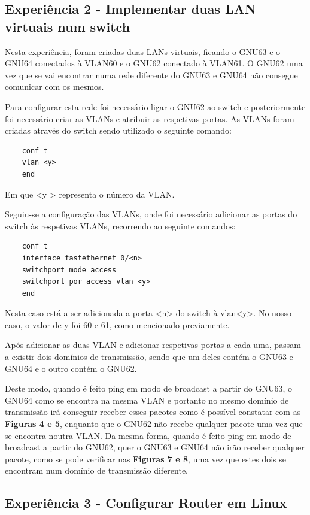 \documentclass[article, a4paper, 11pt, oneside]{memoir}
\begin{document}
\subsection{Experiência 2 - Implementar duas LAN virtuais num switch}

Nesta experiência, foram criadas duas LANs virtuais, ficando o GNU63 e o GNU64 conectados à VLAN60 e o GNU62 conectado à VLAN61.
O GNU62 uma vez que se vai encontrar numa rede diferente do GNU63 e GNU64 não consegue comunicar com os mesmos.


Para configurar esta rede foi necessário ligar o GNU62 ao switch e posteriormente foi necessário criar as VLANs e atribuir as respetivas portas.
As VLANs foram criadas através do switch sendo utilizado o seguinte comando:
\begin{lstlisting}
	conf t
	vlan <y>
	end
\end{lstlisting} 
Em que \textless y \textgreater{} representa o número da VLAN.

Seguiu-se a configuração das VLANs, onde foi necessário adicionar as portas do switch às respetivas VLANs, recorrendo ao seguinte comandos:
\begin{lstlisting}
	conf t
	interface fastethernet 0/<n>
	switchport mode access
	switchport por access vlan <y>
	end
\end{lstlisting} 
Nesta caso está a ser adicionada a porta \textless n\textgreater{} do switch à vlan\textless y\textgreater{}. No nosso caso, o valor de y foi 60 e 61, 
como mencionado previamente.

Após adicionar as duas VLAN e adicionar respetivas portas a cada uma, 
passam a existir dois domínios de transmissão, sendo que um deles contém o GNU63 e GNU64 e o outro contém o GNU62.

Deste modo, quando é feito ping em modo de broadcast a partir do GNU63, o GNU64 como se encontra na mesma VLAN e portanto no mesmo domínio de transmissão
irá conseguir 
receber esses pacotes como é possível constatar com as \textbf{Figuras 4 e 5}, enquanto que o GNU62 não recebe qualquer pacote uma vez que se encontra noutra VLAN.
Da mesma forma, quando é feito ping em modo de broadcast a partir do GNU62, quer o GNU63 e GNU64 não irão receber qualquer pacote, como se pode verificar
nas \textbf{Figuras 7 e 8}, uma vez que estes dois se encontram num domínio de transmissão diferente.


\subsection{Experiência 3 - Configurar Router em Linux}
\end{document}
